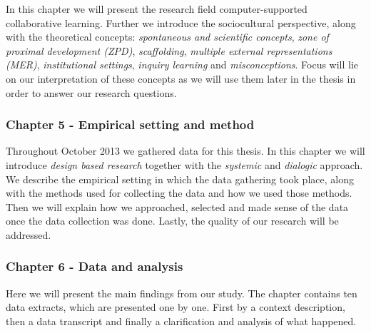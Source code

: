 In this chapter we will present the research field computer-supported collaborative learning. Further we introduce the sociocultural perspective, along with the theoretical concepts: \emph{spontaneous and scientific concepts}, \emph{zone of proximal development (ZPD)}, \emph{scaffolding}, \emph{multiple external representations (MER)}, \emph{institutional settings}, \emph{inquiry learning} and \emph{misconceptions}. Focus will lie on our interpretation of these concepts as we will use them later in the thesis in order to answer our research questions.

\subsubsection*{Chapter 5 - Empirical setting and method}

Throughout October 2013 we gathered data for this thesis. In this chapter we will introduce \emph{design based research} together with the \emph{systemic} and \emph{dialogic} approach. We describe the empirical setting in which the data gathering took place, along with the methods used for collecting the data and how we used those methods. Then we will explain how we approached, selected and made sense of the data once the data collection was done. Lastly, the quality of our research will be addressed. 

\subsubsection*{Chapter 6 - Data and analysis}
Here we will present the main findings from our study. The chapter contains ten data extracts, which are presented one by one. First by a context description, then a data transcript and finally a clarification and analysis of what happened. 

